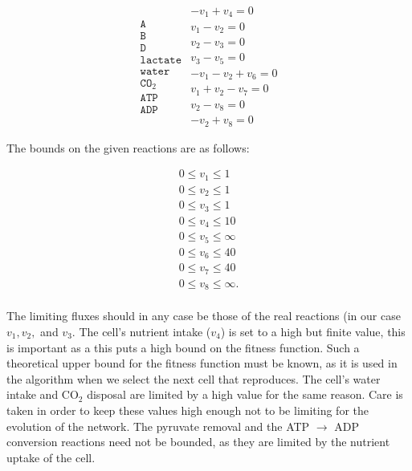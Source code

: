 \documentclass[a4paper,12pt]{article}
\begin{document}
	\begin{equation}\label{eq:lineqs}
	\begin{matrix}
		\texttt{A}  \\
		\texttt{B}\\
		\texttt{D}\\
		\texttt{lactate}\\
		\texttt{water}\\
		\texttt{CO}_2\\
		\texttt{ATP}\\
		\texttt{ADP}
	\end{matrix}
		\begin{matrix}
			- v_1+v_4=0 \\
			v_1-v_2=0 \\
			v_2-v_3=0 \\
			v_3-v_5=0 \\
			-v_1-v_2+v_6=0 \\
			v_1+v_2-v_7=0 \\
			v_2-v_8=0 \\
			-v_2+v_8=0
		\end{matrix}
	\end{equation}

	The bounds on the given reactions are as follows: 

	\begin{equation}\label{eq:bounds}
		\begin{matrix}
			0\leq v_1 \leq 1\\
			0\leq v_2 \leq 1\\
			0\leq v_3 \leq 1\\
			0\leq v_4 \leq 10\\
			0\leq v_5 \leq \infty \\
			0\leq v_6 \leq 40\\
			0\leq v_7 \leq 40\\
			0\leq v_8 \leq \infty.\\
		\end{matrix}
	\end{equation}

	The limiting fluxes should in any case be those of the real reactions (in our case $v_1, v_2,$ and $v_3$. The cell's nutrient intake ($v_4$) is set to a high but finite value, this is important as a this puts a high bound on the fitness function. Such a theoretical upper bound for the fitness function must be known, as it is used in the algorithm when we select the next cell that reproduces. The cell's water intake and CO$_2$ disposal are limited by a high value for the same reason. Care is taken in order to keep these values high enough not to be limiting for the evolution of the network. %
	The pyruvate removal and the ATP $\rightarrow$ ADP conversion reactions need not be bounded, as they are limited by the nutrient uptake of the cell. 
\end{document}
